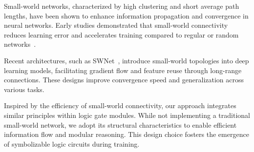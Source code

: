 Small-world networks, characterized by high clustering and short average path lengths, have been shown to enhance information propagation and convergence in neural networks. Early studies demonstrated that small-world connectivity reduces learning error and accelerates training compared to regular or random networks~\cite{watts1998collective,ramanujan2020s}.

Recent architectures, such as SWNet~\cite{javaheripi2019swnet}, introduce small-world topologies into deep learning models, facilitating gradient flow and feature reuse through long-range connections. These designs improve convergence speed and generalization across various tasks.

Inspired by the efficiency of small-world connectivity, our approach integrates similar principles within logic gate modules. While not implementing a traditional small-world network, we adopt its structural characteristics to enable efficient information flow and modular reasoning. This design choice fosters the emergence of symbolizable logic circuits during training.
